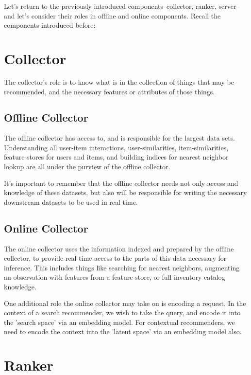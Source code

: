 Let's return to the previously introduced components–collector, ranker, server–and let's consider their roles in offline and online components. Recall the components introduced before:

\section{Collector}

The collector's role is to know what is in the collection of things that may be recommended, and the necessary features or attributes of those things.

\subsection{Offline Collector}

The offline collector has access to, and is responsible for the largest data sets. Understanding all user-item interactions, user-similarities, item-similarities, feature stores for users and items, and building indices for nearest neighbor lookup are all under the purview of the offline collector.

It's important to remember that the offline collector needs not only access and knowledge of these datasets, but also will be responsible for writing the necessary downstream datasets to be used in real time.

\subsection{Online Collector}

The online collector uses the information indexed and prepared by the offline collector, to provide real-time access to the parts of this data necessary for inference. This includes things like searching for nearest neighbors, augmenting an observation with features from a feature store, or full inventory catalog knowledge. 

One additional role the online collector may take on is encoding a request. In the context of a search recommender, we wish to take the query, and encode it into the 'search space' via an embedding model. For contextual recommenders, we need to encode the context into the 'latent space' via an embedding model also. 

\section{Ranker}

